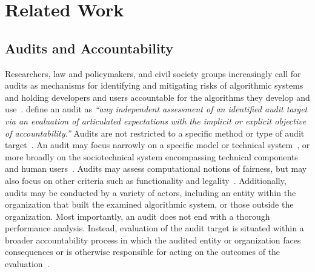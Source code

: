 \section{Related Work}
\label{sec:relatedwork}


\subsection{Audits and Accountability}
\label{sec:relatedwork-audits}
Researchers, law and policymakers, and civil society groups increasingly call for audits as mechanisms for identifying and mitigating risks of algorithmic systems and holding developers and users accountable for the algorithms they develop and use~\cite{raji2022outsider, wyden2023algorithmic}. \citet{birhane2024ai} define an audit as \textit{``any independent assessment of an identified audit target via an evaluation of articulated expectations with the implicit or explicit objective of accountability.''} Audits are not restricted to a specific method or type of audit target~\cite{ojewale2025towards, birhane2024ai, goodman2022algorithmic}. An audit may focus narrowly on a specific model or technical system~\cite{buolamwini2018gender}, or more broadly on the sociotechnical system encompassing technical components and human users~\cite{lam2023sociotechnical}. Audits may assess computational notions of fairness, but may also focus on other criteria such as functionality and legality~\cite{radiya2023sociotechnical, ojewale2025towards, abebe2022adversarial}. Additionally, audits may be conducted by a variety of actors, including an entity within the organization that built the examined algorithmic system, or those outside the organization. Most importantly, an audit does not end with a thorough performance analysis. Instead, evaluation of the audit target is situated within a broader accountability process in which the audited entity or organization faces consequences or is otherwise responsible for acting on the outcomes of the evaluation~\cite{ojewale2025towards}.


